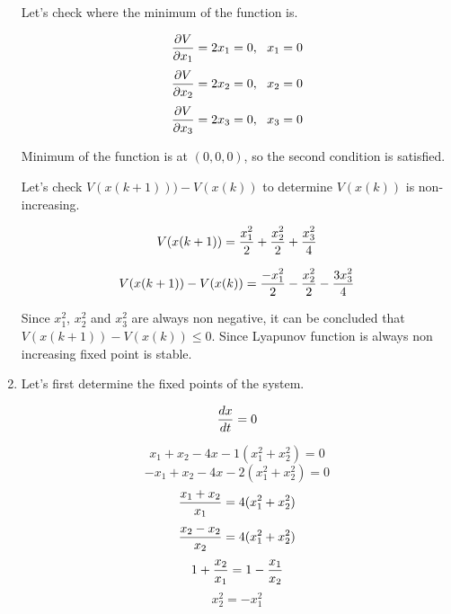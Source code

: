 \documentclass[12pt,a4paper, margin=1in]{article}
\begin{document}
\begin{enumerate}
        Let's check where the minimum of the function is.

        \begin{equation*}
            \frac{\displaystyle \partial V}{\displaystyle \partial x_1} = 2x_1 = 0, \ \ x_1 = 0
        \end{equation*}
        \begin{equation*}
            \frac{\displaystyle \partial V}{\displaystyle \partial x_2} = 2x_2 = 0,  \ \ x_2 = 0
        \end{equation*}
        \begin{equation*}
            \ddfrac{\partial V}{\partial x_3} = 2x_3 = 0,  \ \ x_3 = 0
        \end{equation*}
        
        Minimum of the function is at $(0,0,0)$, so the second condition is satisfied. 

        Let's check $V(x(k+1))) - V(x(k))$ to determine $V(x(k))$ is non-increasing.

        \begin{equation*}
            V(x(k+1)) = \frac{\displaystyle x_1^2}{\displaystyle 2} + \frac{\displaystyle x_2^2}{\displaystyle 2} + \frac{\displaystyle x_3^2}{\displaystyle 4}
        \end{equation*}

        \begin{equation*}
            V(x(k+1)) - V(x(k)) = \frac{\displaystyle -x_1^2}{\displaystyle 2} - \frac{\displaystyle x_2^2}{\displaystyle 2} - \frac{\displaystyle 3x_3^2}{\displaystyle 4}
        \end{equation*}

        Since $x_1^2$, $x_2^2$ and $x_3^2$ are always non negative, it can be concluded that
        $V(x(k+1)) - V(x(k)) \leq 0$. Since Lyapunov function is always non increasing fixed point is stable.
    \item %
        Let's first determine the fixed points of the system. 

        \begin{equation*}
            \frac{\displaystyle dx}{\displaystyle dt} = 0
        \end{equation*}

        \begin{equation*}
            x_1 + x_2 - 4x-1(x_1^2 + x_2^2) = 0
        \end{equation*}
        \begin{equation*}
            -x_1 + x_2 - 4x-2(x_1^2 + x_2^2) = 0
        \end{equation*}
        \begin{equation*}
            \frac{\displaystyle x_1+x_2}{\displaystyle x_1} = 4(x_1^2+x_2^2)
        \end{equation*}
        \begin{equation*}
            \frac{\displaystyle x_2-x_2}{\displaystyle x_2} = 4(x_1^2+x_2^2)
        \end{equation*}
        \begin{equation*}
            1+\frac{\displaystyle x_2}{\displaystyle x_1} = 1 - \frac{\displaystyle x_1}{\displaystyle x_2}
        \end{equation*}
        \begin{equation*}
            x_2^2 = -x_1^2
        \end{equation*}


\end{enumerate}
\end{document}
